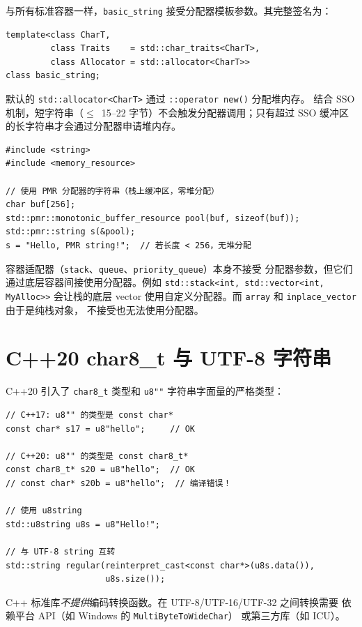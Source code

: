 \documentclass[12pt,a4paper,fontset=fandol]{ctexbook}
\newcommand{\cpp}[1]{C++#1}
\newcommand{\Fn}[1]{\texttt{#1()}}
\newcommand{\Tp}[1]{\texttt{#1}}
\begin{document}
与所有标准容器一样，\texttt{basic\_string} 接受分配器模板参数。其完整签名为：
\begin{lstlisting}
template<class CharT,
         class Traits    = std::char_traits<CharT>,
         class Allocator = std::allocator<CharT>>
class basic_string;
\end{lstlisting}

默认的 \Tp{std::allocator<CharT>} 通过 \Fn{::operator new} 分配堆内存。
结合 SSO 机制，短字符串（$\leq$~15--22 字节）不会触发分配器调用；只有超过
SSO 缓冲区的长字符串才会通过分配器申请堆内存。

\begin{lstlisting}
#include <string>
#include <memory_resource>

// 使用 PMR 分配器的字符串（栈上缓冲区，零堆分配）
char buf[256];
std::pmr::monotonic_buffer_resource pool(buf, sizeof(buf));
std::pmr::string s(&pool);
s = "Hello, PMR string!";  // 若长度 < 256，无堆分配
\end{lstlisting}

\begin{note}
容器适配器（\texttt{stack}、\texttt{queue}、\texttt{priority\_queue}）本身不接受
分配器参数，但它们通过底层容器间接使用分配器。例如
\texttt{std::stack<int, std::vector<int, MyAlloc>>} 会让栈的底层 vector
使用自定义分配器。而 \texttt{array} 和 \texttt{inplace\_vector} 由于是纯栈对象，
不接受也无法使用分配器。
\end{note}

\section{C++20 char8\_t 与 UTF-8 字符串}

\cpp{20} 引入了 \texttt{char8\_t} 类型和 \texttt{u8""} 字符串字面量的严格类型：

\begin{lstlisting}
// C++17: u8"" 的类型是 const char*
const char* s17 = u8"hello";     // OK

// C++20: u8"" 的类型是 const char8_t*
const char8_t* s20 = u8"hello";  // OK
// const char* s20b = u8"hello";  // 编译错误！

// 使用 u8string
std::u8string u8s = u8"Hello!";

// 与 UTF-8 string 互转
std::string regular(reinterpret_cast<const char*>(u8s.data()),
                    u8s.size());
\end{lstlisting}

\begin{warning}
C++ 标准库\emph{不提供}编码转换函数。在 UTF-8/UTF-16/UTF-32 之间转换需要
依赖平台 API（如 Windows 的 \texttt{MultiByteToWideChar}）
或第三方库（如 ICU）。
\end{warning}
\end{document}
